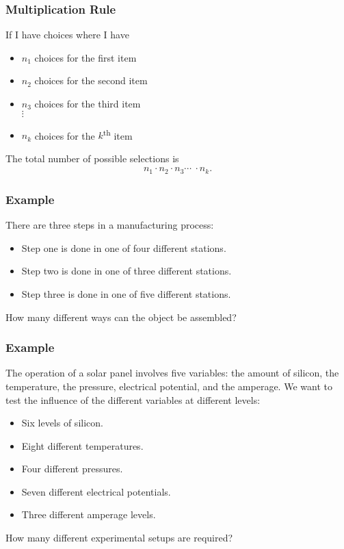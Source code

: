 \begin{frame}
  \frametitle{Multiplication Rule}

  \begin{definition}
    If I have choices where I have
    \begin{itemize}
    \item $n_1$ choices for the first item
    \item $n_2$ choices for the second item
    \item $n_3$ choices for the third item \\
      $\vdots$
    \item $n_k$ choices for the $k$\textsuperscript{th} item \\
    \end{itemize}

    The total number of possible selections is 
    \begin{eqnarray*}
      n_1 \cdot n_2 \cdot n_3 \cdots ~ \cdot n_k.
    \end{eqnarray*}

  \end{definition}

\end{frame}


\begin{frame}
  \frametitle{Example}
  There are three steps in a manufacturing process:
  \begin{itemize}
  \item Step one is done in one of four different stations.
  \item Step two is done in one of three different stations.
  \item Step three is done in one of five different stations.
  \end{itemize}

  How many different ways can the object be assembled?
\end{frame}

\begin{frame}
  \frametitle{Example}
  The operation of a solar panel involves five variables: the amount
  of silicon, the temperature, the pressure, electrical potential, and
  the amperage. We want to test the influence of the different
  variables at different levels:
  \begin{itemize}
  \item Six levels of silicon.
  \item Eight different temperatures.
  \item Four different pressures.
  \item Seven different electrical potentials.
  \item Three different amperage levels.
  \end{itemize}

  How many different experimental setups are required?
\end{frame}


